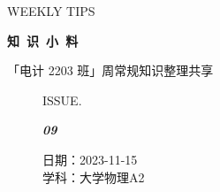 \documentclass[UTF8]{ctexart}
\newcommand\Black[1]{\textcolor[gray]{0.3}{#1}}
\newcommand\Brown[1]{\textcolor[HTML]{998A4E}{#1}}
\newcommand\IssueNumber{09}
\newcommand\Date{2023-11-15}
\newcommand\Subject{大学物理A2}
\begin{document}
\BgThispage
\begin{center}
{\scriptsize\Issue \textcolor[HTML]{C8BA83}{WEEKLY TIPS}}

{\Huge\bfseries\TitleFont \Black{知\ 识\ 小\ 料}}

\vspace{-0.1cm}
{\footnotesize \Brown{「电计 2203 班」周常规知识整理共享}}
\end{center}

\vspace{-0.5cm}

\begin{figure}[H]
\hspace{1cm}
\begin{minipage}[t]{0.3\textwidth}
\centering
    \Brown{ISSUE.}

    \vspace{-0.6cm}
    \Huge \Issue\slshape\bfseries\Black{\IssueNumber}
\end{minipage}
\hfill
\begin{minipage}[t]{0.3\textwidth}
\centering
    \Brown{日期：\Date} \\
\vspace{-0.1cm}
    \Brown{学科：\Subject} \\
\end{minipage}
\vspace{-0.2cm}
\end{figure}
\end{document}
